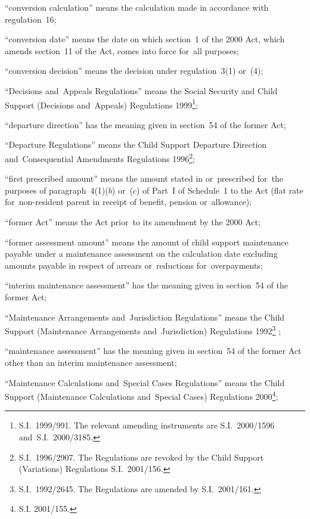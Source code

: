 \documentclass[12pt,a4paper]{article}
\begin{document}
\begin{enumerate}
“conversion calculation” means the calculation made in accordance with regulation~16;

“conversion date” means the date on which section~1 of the 2000 Act, which amends section~11 of the Act, comes into force for~all purposes;

“conversion decision” means the decision under regulation~3(1) or~(4);

“Decisions and~Appeals Regulations” means the Social Security and Child Support (Decisions and~Appeals) Regulations 1999\footnote{S.I.~1999/991. The relevant amending instruments are S.I.~2000/1596 and~S.I.~2000/3185.};

“departure direction” has the meaning given in section~54 of the former Act;

“Departure Regulations” means the Child Support Departure Direction and~Consequential Amendments Regulations 1996\footnote{S.I.~1996/2907. The Regulations are revoked by the Child Support (Variations) Regulations S.I.~2001/156.};

“first prescribed amount” means the amount stated in or~prescribed for~the purposes of paragraph~4(1)($b$)  or~($c$)  of Part~I of Schedule~1 to the Act (flat rate for~non-resident parent in receipt of benefit, pension or~allowance);

“former Act” means the Act prior~to its amendment by the 2000 Act;

“former assessment amount” means the amount of child support maintenance payable under a maintenance assessment on the calculation date excluding amounts payable in respect of arrears or~reductions for~overpayments;

“interim maintenance assessment” has the meaning given in section~54 of the former Act;

“Maintenance Arrangements and~Jurisdiction Regulations” means the Child Support (Maintenance Arrangements and~Jurisdiction) Regulations 1992\footnote{S.I.~1992/2645. The Regulations are amended by S.I.~2001/161.}%
;

“maintenance assessment” has the meaning given in section~54 of the former Act other than an interim maintenance assessment;

“Maintenance Calculations and~Special Cases Regulations” means the Child Support (Maintenance Calculations and~Special Cases) Regulations 2000\footnote{\frenchspacing S.I. 2001/155.};


\end{enumerate}
\end{document}
